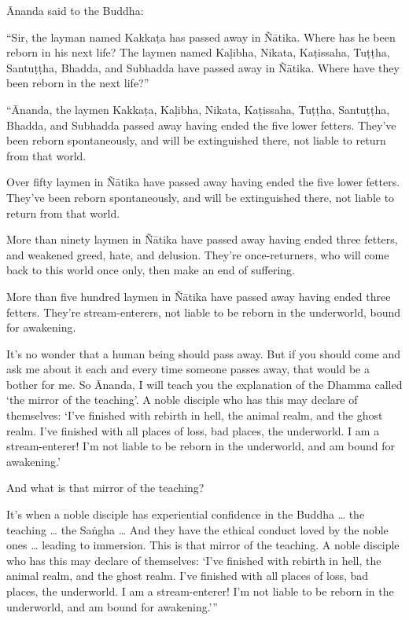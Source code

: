 \documentclass[12pt,openany]{book}%
\begin{document}
Ānanda said to the Buddha: 

“Sir, the layman named \textsanskrit{Kakkaṭa} has passed away in \textsanskrit{Ñātika}. Where has he been reborn in his next life? The laymen named \textsanskrit{Kaḷibha}, Nikata, \textsanskrit{Kaṭissaha}, \textsanskrit{Tuṭṭha}, \textsanskrit{Santuṭṭha}, Bhadda, and Subhadda have passed away in \textsanskrit{Ñātika}. Where have they been reborn in the next life?” 

“Ānanda, the laymen \textsanskrit{Kakkaṭa}, \textsanskrit{Kaḷibha}, Nikata, \textsanskrit{Kaṭissaha}, \textsanskrit{Tuṭṭha}, \textsanskrit{Santuṭṭha}, Bhadda, and Subhadda passed away having ended the five lower fetters. They’ve been reborn spontaneously, and will be extinguished there, not liable to return from that world. 

Over fifty laymen in \textsanskrit{Ñātika} have passed away having ended the five lower fetters. They’ve been reborn spontaneously, and will be extinguished there, not liable to return from that world. 

More than ninety laymen in \textsanskrit{Ñātika} have passed away having ended three fetters, and weakened greed, hate, and delusion. They’re once-returners, who will come back to this world once only, then make an end of suffering. 

More than five hundred laymen in \textsanskrit{Ñātika} have passed away having ended three fetters. They’re stream-enterers, not liable to be reborn in the underworld, bound for awakening. 

It’s no wonder that a human being should pass away. But if you should come and ask me about it each and every time someone passes away, that would be a bother for me. So Ānanda, I will teach you the explanation of the Dhamma called ‘the mirror of the teaching’. A noble disciple who has this may declare of themselves: ‘I’ve finished with rebirth in hell, the animal realm, and the ghost realm. I’ve finished with all places of loss, bad places, the underworld. I am a stream-enterer! I’m not liable to be reborn in the underworld, and am bound for awakening.’ 

And what is that mirror of the teaching? 

It’s when a noble disciple has experiential confidence in the Buddha … the teaching … the \textsanskrit{Saṅgha} … And they have the ethical conduct loved by the noble ones … leading to immersion. This is that mirror of the teaching. A noble disciple who has this may declare of themselves: ‘I’ve finished with rebirth in hell, the animal realm, and the ghost realm. I’ve finished with all places of loss, bad places, the underworld. I am a stream-enterer! I’m not liable to be reborn in the underworld, and am bound for awakening.’” 
\end{document}
